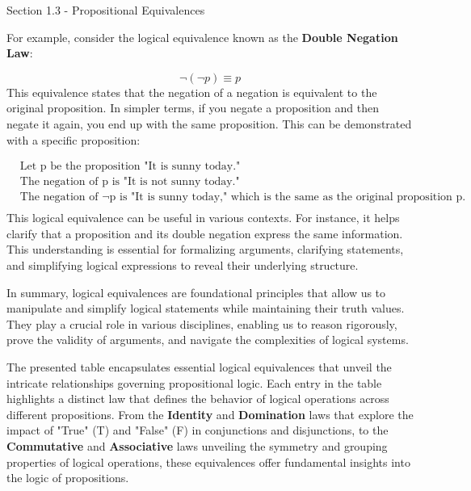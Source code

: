 \begin{notes}{Section 1.3 - Propositional Equivalences}
    \begin{Highlight}
        For example, consider the logical equivalence known as the \textbf{Double Negation Law}:

        \begin{equation*}
            \neg(\neg p) \equiv p
        \end{equation*}
        This equivalence states that the negation of a negation is equivalent to the original proposition. In simpler terms, if you negate a proposition and then negate it again, you end up with the same 
        proposition. This can be demonstrated with a specific proposition:

        \begin{align*}
            & \text{Let p be the proposition "It is sunny today."} \\
            & \text{The negation of p is "It is not sunny today."} \\
            & \text{The negation of $\neg$p is "It is sunny today," which is the same as the original proposition p.} \\
        \end{align*}
        This logical equivalence can be useful in various contexts. For instance, it helps clarify that a proposition and its double negation express the same information. This understanding is essential 
        for formalizing arguments, clarifying statements, and simplifying logical expressions to reveal their underlying structure.
    \end{Highlight}

    In summary, logical equivalences are foundational principles that allow us to manipulate and simplify logical statements while maintaining their truth values. They play a crucial role in various disciplines, 
    enabling us to reason rigorously, prove the validity of arguments, and navigate the complexities of logical systems.

    The presented table encapsulates essential logical equivalences that unveil the intricate relationships governing propositional logic. Each entry in the table highlights a distinct law that defines the behavior 
    of logical operations across different propositions. From the \textbf{Identity} and \textbf{Domination} laws that explore the impact of "True" (T) and "False" (F) in conjunctions and disjunctions, to the 
    \textbf{Commutative} and \textbf{Associative} laws unveiling the symmetry and grouping properties of logical operations, these equivalences offer fundamental insights into the logic of propositions.


\end{notes}
